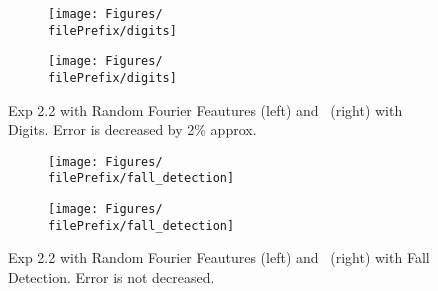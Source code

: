 \begin{figure}[H]
  \centering
  \renewcommand{\filePrefix}{\undPrefix/rff}
  \begin{subfigure}[t]{0.5\linewidth}
    \centering\captionsetup{width=.8\linewidth}\texttt{[image: Figures/\\filePrefix/digits]}
    \label{fig:\undPrefix_digits}
  \end{subfigure}%
  \renewcommand{\filePrefix}{\undPrefix/nys}%
  \begin{subfigure}[t]{0.5\linewidth}
    \centering\captionsetup{width=.8\linewidth}\texttt{[image: Figures/\\filePrefix/digits]}
    \label{fig:\undPrefix_digits}
  \end{subfigure}
  \caption*{Exp 2.2 with Random Fourier Feautures (left) and \Nys\ (right) with Digits. Error is decreased by 2\% approx.}
\end{figure}


\begin{figure}[H]
  \centering
  \renewcommand{\filePrefix}{\undPrefix/rff}
  \begin{subfigure}[t]{0.5\linewidth}
    \centering\captionsetup{width=.8\linewidth}\texttt{[image: Figures/\\filePrefix/fall\_detection]}
    \label{fig:\undPrefix_fall_detection}
  \end{subfigure}%
  \renewcommand{\filePrefix}{\undPrefix/nys}%
  \begin{subfigure}[t]{0.5\linewidth}
    \centering\captionsetup{width=.8\linewidth}\texttt{[image: Figures/\\filePrefix/fall\_detection]}
    \label{fig:\undPrefix_fall_detection}
  \end{subfigure}%
  \caption*{Exp 2.2 with Random Fourier Feautures (left) and \Nys\ (right)
   with Fall Detection. Error is not decreased.}
\end{figure}

